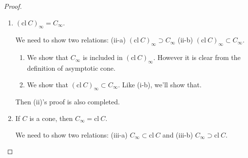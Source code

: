 \documentclass[a4paper,11pt]{jsarticle}
\newcommand{\NaturalNumberSet}{\mathbb{N}}
\begin{document}
\begin{proof}
\begin{enumerate}[label=\roman*,align=CenterWithParen]
\begin{enumerate}[label=i-\alph*,align=CenterWithParen]
        Also we can find that

        \begin{equation}
          \begin{split}
            t_n &\rightarrow \infty \:\text{as}\: n \rightarrow \infty, \\
            x_n &\in C, \:\text{and}\: \\
            \frac{x_n}{t_n} &= \frac{x_{k(n)}^{m(n)}}{t_{k(n)}^{m(n)}}. \notag
          \end{split}
        \end{equation}

        Hence we get for each $n \in \NaturalNumberSet$

        \begin{equation}
          0 \leq \left\lVert \frac{x_n}{t_n} - d\right\rVert \leq \left\lVert \frac{x_{k(n)}^{m(n)}}{t_{k(n)}^{m(n)}} - d_{k(n)}\right\rVert + \left\lVert d_{k(n)} -d \right\rVert< \frac{1}{2n} \rightarrow 0 \notag
        \end{equation}

        as $n \rightarrow \infty$.

        Thus $d \in C_{\infty}$, that is, $C_{\infty}$ is a closed set.
      \end{enumerate}
      Then (i)'s proof is completed.
    \item $(\text{cl}\:C)_{\infty} = C_{\infty}$.

    We need to show two relations: (ii-a) $(\text{cl}\:C)_{\infty} \supset C_{\infty}$ (ii-b) $(\text{cl}\:C)_{\infty} \subset C_{\infty}$.

      \begin{enumerate}[label=ii-\alph*,align=CenterWithParen2]
        \item We show that $C_{\infty}$ is included in $(\text{cl}\:C)_{\infty}$. However it is clear from the definition of asymptotic cone.

        \item We show that $(\text{cl}\:C)_{\infty} \subset C_{\infty}$. Like (i-b), we'll show that.

      \end{enumerate}
      Then (ii)'s proof is also completed.
    \item If $C$ is a cone, then $C_{\infty} = \text{cl}\:C$.

    We need to show two relations: (iii-a) $C_{\infty} \subset \text{cl}\:C$ and (iii-b) $C_{\infty} \supset  \text{cl}\:C$.


\end{enumerate}
\end{proof}
\end{document}
